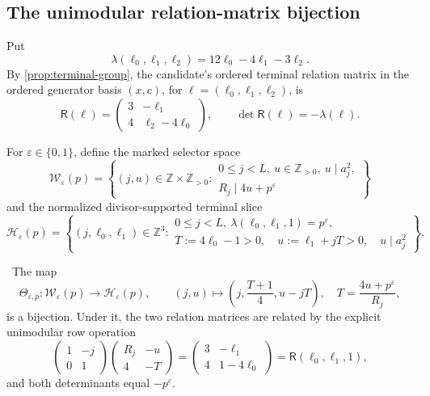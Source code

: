\subsection{The unimodular relation-matrix bijection}

Put
\[
 \lambda(\ell_0,\ell_1,\ell_2)
 =12\ell_0-4\ell_1-3\ell_2.
\]
By \cref{prop:terminal-group}, the candidate's ordered terminal relation
matrix in the ordered generator basis \((x,c)\), for
\(\ell=(\ell_0,\ell_1,\ell_2)\), is
\[
 \mathsf R(\ell)=
 \begin{pmatrix}
 3&-\ell_1\\
 4&\ell_2-4\ell_0
 \end{pmatrix},
 \qquad \det\mathsf R(\ell)=-\lambda(\ell).
\]

For \(\varepsilon\in\{0,1\}\), define the marked selector space
\[
\mathcal W_\varepsilon(p)=
 \left\{(j,u)\in\mathbb Z\times\mathbb Z_{>0}:
 \begin{array}{l}
 0\le j<L,\ u\in\mathbb Z_{>0},\ u\mid a_j^2,\\
 R_j\mid4u+p^\varepsilon
 \end{array}
 \right\}
\]
and the normalized divisor-supported terminal slice
\[
\mathcal H_\varepsilon(p)=
 \left\{(j,\ell_0,\ell_1)\in\mathbb Z^3:
 \begin{array}{l}
 0\le j<L,\ \lambda(\ell_0,\ell_1,1)=p^\varepsilon,\\
 T:=4\ell_0-1>0,\quad
 u:=\ell_1+jT>0,\quad u\mid a_j^2
 \end{array}
 \right\}.
\]

\begin{theorem}
\label{thm:es-s6-selector-terminal-bijection}
\Verified\ The map
\[
 \Theta_{\varepsilon,p}:\mathcal W_\varepsilon(p)
 \longrightarrow\mathcal H_\varepsilon(p),
 \qquad
 (j,u)\longmapsto
 \left(j,\frac{T+1}{4},u-jT\right),
 \quad T=\frac{4u+p^\varepsilon}{R_j},
\]
is a bijection.  Under it, the two relation matrices are related by the
explicit unimodular row operation
\[
 \begin{pmatrix}1&-j\\0&1\end{pmatrix}
 \begin{pmatrix}R_j&-u\\4&-T\end{pmatrix}
 =
 \begin{pmatrix}3&-\ell_1\\4&1-4\ell_0\end{pmatrix}
 =\mathsf R(\ell_0,\ell_1,1),
\]
and both determinants equal \(-p^\varepsilon\).
\end{theorem}

